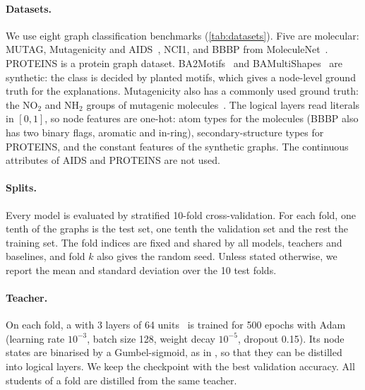\paragraph{Datasets.}
We use eight graph classification benchmarks (\cref{tab:datasets}). Five are molecular:
MUTAG, Mutagenicity and AIDS~, NCI1, and BBBP from
MoleculeNet~. PROTEINS is a protein graph dataset. BA2Motifs~ and
BAMultiShapes~ are synthetic: the class is decided by planted motifs, which
gives a node-level ground truth for the explanations. Mutagenicity also has a commonly used
ground truth: the NO$_2$ and NH$_2$ groups of mutagenic molecules~.
The logical layers read literals in $[0,1]$, so node features are one-hot: atom types for the
molecules (BBBP also has two binary flags, aromatic and in-ring), secondary-structure types
for PROTEINS, and the constant features of the synthetic graphs. The continuous
attributes of AIDS and PROTEINS are not used.



\paragraph{Splits.}
Every model is evaluated by stratified 10-fold cross-validation. For each fold, one tenth of
the graphs is the test set, one tenth the validation set and the rest the training set. The
fold indices are fixed and shared by all models, teachers and baselines, and fold $k$ also
gives the random seed. Unless stated otherwise, we report the mean and standard deviation
over the 10 test folds.

\paragraph{Teacher.}
On each fold, a \teacher{} with 3 layers of 64 units~ is trained for 500 epochs with
Adam (learning rate $10^{-3}$, batch size 128, weight decay $10^{-5}$, dropout 0.15).
Its node states are binarised by a Gumbel-sigmoid, as in \logix{}, so that they can be distilled into
logical layers. We keep the checkpoint with the best validation accuracy. All students of
a fold are distilled from the same teacher.

